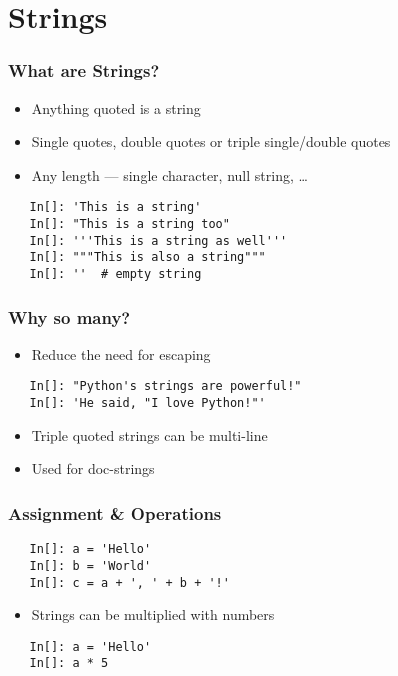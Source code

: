 \section{Strings}

\begin{frame}[fragile]
  \frametitle{What are Strings?}
  \begin{itemize}
  \item Anything quoted is a string
  \item Single quotes, double quotes or triple single/double quotes
  \item Any length --- single character, null string, \ldots
  \end{itemize}
  \begin{lstlisting}
   In[]: 'This is a string'
   In[]: "This is a string too"
   In[]: '''This is a string as well'''
   In[]: """This is also a string"""
   In[]: ''  # empty string
  \end{lstlisting}
\end{frame}

\begin{frame}[fragile]
  \frametitle{Why so many?}
  \begin{itemize}
  \item Reduce the need for escaping 
  \end{itemize}
  \begin{lstlisting}
   In[]: "Python's strings are powerful!"
   In[]: 'He said, "I love Python!"'
  \end{lstlisting}
  \begin{itemize}
  \item Triple quoted strings can be multi-line
  \item Used for doc-strings
  \end{itemize}
\end{frame}

\begin{frame}[fragile]
  \frametitle{Assignment \& Operations}
  \begin{lstlisting}
   In[]: a = 'Hello'
   In[]: b = 'World'
   In[]: c = a + ', ' + b + '!'
  \end{lstlisting}
  \begin{itemize}
  \item Strings can be multiplied with numbers
  \end{itemize}
  \begin{lstlisting}
   In[]: a = 'Hello'
   In[]: a * 5
  \end{lstlisting}
\end{frame}


